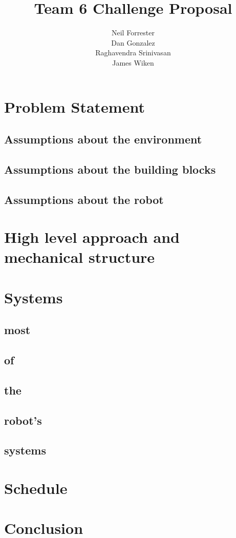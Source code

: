 \documentclass[letterpaper,12pt]{article}
\title{Team 6 Challenge Proposal}
\author{Neil Forrester\\Dan Gonzalez\\Raghavendra Srinivasan\\James Wiken}
\begin{document}
\begin{singlespacing}
\maketitle
\thispagestyle{empty}
\newpage

\tableofcontents
\listoffigures
\listoftables
\thispagestyle{empty}
\newpage

\end{singlespacing}

\setcounter{page}{1}

\section{Problem Statement}
\subsection{Assumptions about the environment}
\subsection{Assumptions about the building blocks}
\subsection{Assumptions about the robot}
\section{High level approach and mechanical structure}
\section{Systems}
\subsection{most}
\subsection{of}
\subsection{the}
\subsection{robot's}
\subsection{systems}
\section{Schedule}
\section{Conclusion}
\end{document}
